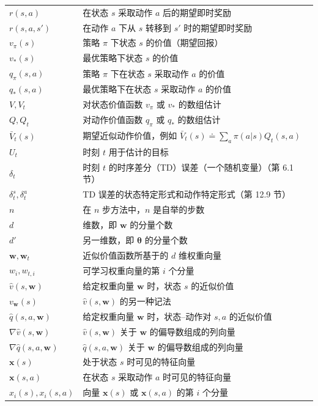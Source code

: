 \documentclass[UTF8,12pt,a4paper,fontset=fandol]{ctexart}
\begin{document}
\begin{longtable}{p{}p{}}
$r(s,a)$ & 在状态 $s$ 采取动作 $a$ 后的期望即时奖励 \\
$r(s,a,s')$ & 在动作 $a$ 下从 $s$ 转移到 $s'$ 时的期望即时奖励 \\
$v_\pi(s)$ & 策略 $\pi$ 下状态 $s$ 的价值（期望回报） \\
$v_*(s)$ & 最优策略下状态 $s$ 的价值 \\
$q_\pi(s,a)$ & 策略 $\pi$ 下在状态 $s$ 采取动作 $a$ 的价值 \\
$q_*(s,a)$ & 最优策略下在状态 $s$ 采取动作 $a$ 的价值 \\
$V,V_t$ & 对状态价值函数 $v_\pi$ 或 $v_*$ 的数组估计 \\
$Q,Q_t$ & 对动作价值函数 $q_\pi$ 或 $q_*$ 的数组估计 \\
$\bar V_t(s)$ & 期望近似动作价值，例如 $\bar V_t(s)\doteq\sum_a\pi(a|s)Q_t(s,a)$ \\
$U_t$ & 时刻 $t$ 用于估计的目标 \\
$\delta_t$ & 时刻 $t$ 的时序差分（TD）误差（一个随机变量）（第 6.1 节） \\
$\delta_t^s,\delta_t^a$ & TD 误差的状态特定形式和动作特定形式（第 12.9 节） \\
$n$ & 在 $n$ 步方法中，$n$ 是自举的步数 \\
$d$ & 维数，即 $\mathbf{w}$ 的分量个数 \\
$d'$ & 另一维数，即 $\boldsymbol{\theta}$ 的分量个数 \\
$\mathbf{w},\mathbf{w}_t$ & 近似价值函数所基于的 $d$ 维权重向量 \\
$w_i,w_{t,i}$ & 可学习权重向量的第 $i$ 个分量 \\
$\hat v(s,\mathbf{w})$ & 给定权重向量 $\mathbf{w}$ 时，状态 $s$ 的近似价值 \\
$v_{\mathbf{w}}(s)$ & $\hat v(s,\mathbf{w})$ 的另一种记法 \\
$\hat q(s,a,\mathbf{w})$ & 给定权重向量 $\mathbf{w}$ 时，状态--动作对 $s,a$ 的近似价值 \\
$\nabla\hat v(s,\mathbf{w})$ & $\hat v(s,\mathbf{w})$ 关于 $\mathbf{w}$ 的偏导数组成的列向量 \\
$\nabla\hat q(s,a,\mathbf{w})$ & $\hat q(s,a,\mathbf{w})$ 关于 $\mathbf{w}$ 的偏导数组成的列向量 \\
$\mathbf{x}(s)$ & 处于状态 $s$ 时可见的特征向量 \\
$\mathbf{x}(s,a)$ & 在状态 $s$ 采取动作 $a$ 时可见的特征向量 \\
$x_i(s),x_i(s,a)$ & 向量 $\mathbf{x}(s)$ 或 $\mathbf{x}(s,a)$ 的第 $i$ 个分量 \\

\end{longtable}
\end{document}
